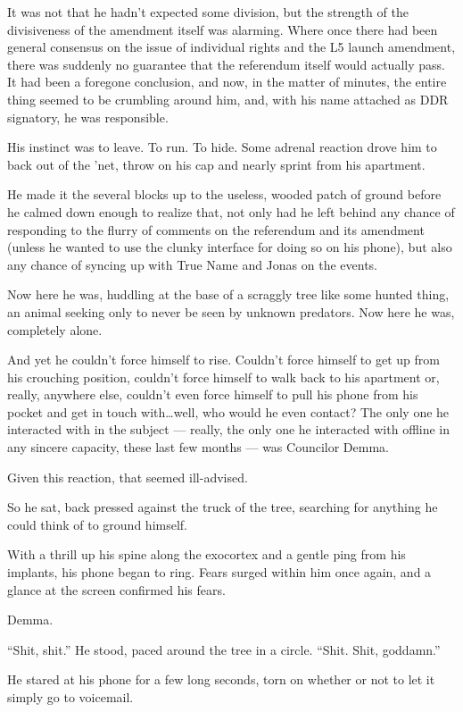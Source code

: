 It was not that he hadn't expected some division, but the strength of the divisiveness of the amendment itself was alarming. Where once there had been general consensus on the issue of individual rights and the L5 launch amendment, there was suddenly no guarantee that the referendum itself would actually pass. It had been a foregone conclusion, and now, in the matter of minutes, the entire thing seemed to be crumbling around him, and, with his name attached as DDR signatory, he was responsible.

His instinct was to leave. To run. To hide. Some adrenal reaction drove him to back out of the 'net, throw on his cap and nearly sprint from his apartment.

He made it the several blocks up to the useless, wooded patch of ground before he calmed down enough to realize that, not only had he left behind any chance of responding to the flurry of comments on the referendum and its amendment (unless he wanted to use the clunky interface for doing so on his phone), but also any chance of syncing up with True Name and Jonas on the events.

Now here he was, huddling at the base of a scraggly tree like some hunted thing, an animal seeking only to never be seen by unknown predators. Now here he was, completely alone.

And yet he couldn't force himself to rise. Couldn't force himself to get up from his crouching position, couldn't force himself to walk back to his apartment or, really, anywhere else, couldn't even force himself to pull his phone from his pocket and get in touch with\ldots well, who would he even contact? The only one he interacted with in the subject — really, the only one he interacted with offline in any sincere capacity, these last few months — was Councilor Demma.

Given this reaction, that seemed ill-advised.

So he sat, back pressed against the truck of the tree, searching for anything he could think of to ground himself.

With a thrill up his spine along the exocortex and a gentle ping from his implants, his phone began to ring. Fears surged within him once again, and a glance at the screen confirmed his fears.

Demma.

``Shit, shit.'' He stood, paced around the tree in a circle. ``Shit. Shit, goddamn.''

He stared at his phone for a few long seconds, torn on whether or not to let it simply go to voicemail.

